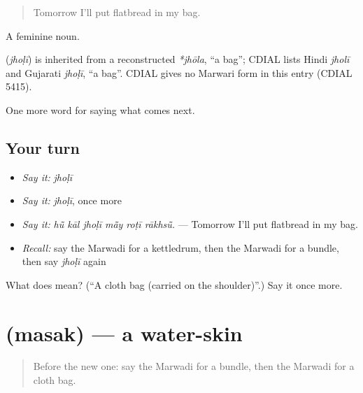 \begin{quote}
Tomorrow I'll put flatbread in my bag.
\end{quote}

A feminine noun.

\begin{cousinweb}
\textbf{} (\emph{jhoḷī}) is inherited from a reconstructed \emph{*jhōla}, \textquotedblleft{}a bag\textquotedblright{}; CDIAL lists Hindi \emph{jholī} and Gujarati \emph{jhoḷī}, \textquotedblleft{}a bag\textquotedblright{}. CDIAL gives no Marwari form in this entry (CDIAL 5415).
\end{cousinweb}

\begin{grammarlens}[title={What you've built}]
One more word for saying what comes next.
\end{grammarlens}

\subsection*{Your turn}
\begin{itemize}
\raggedright
  \item \emph{Say it:} \emph{jhoḷī}
  \item \emph{Say it:} \emph{jhoḷī}, once more
  \item \emph{Say it:} \emph{hū̃ kāl jhoḷī mā̃y roṭī rākhsū̃.} — Tomorrow I'll put flatbread in my bag.
  \item \emph{Recall:} say the Marwadi for a kettledrum, then the Marwadi for a bundle, then say \emph{jhoḷī} again
\end{itemize}

\begin{tcolorbox}[breakable,colback=teal!4,colframe=teal!35!black,title={Before you move on}]
What does  mean? (\textquotedblleft{}A cloth bag (carried on the shoulder)\textquotedblright{}.) Say it once more.
\end{tcolorbox}
\section[\texorpdfstring{\mw{मसक} (masak)}{मसक (masak)}]{ (masak) — a water-skin}

\label{lesson:MW-C225-masak}



\begin{quote}
Before the new one: say the Marwadi for a bundle, then the Marwadi for a cloth bag.
\end{quote}

